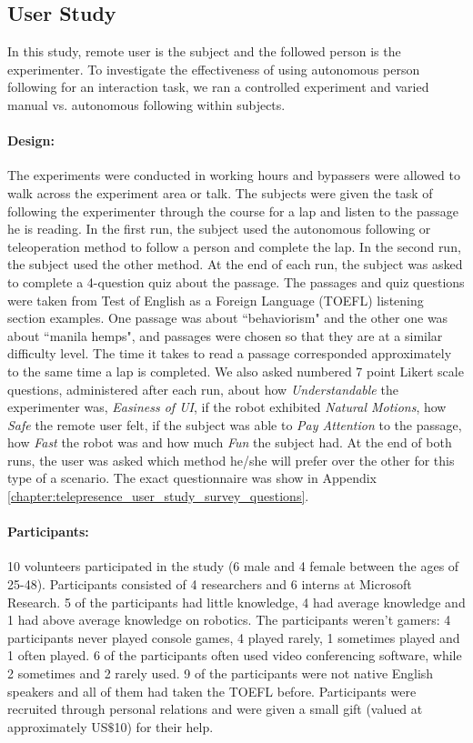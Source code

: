 \subsection{User Study}

In this study, remote user is the subject and the followed person is the experimenter. To investigate the effectiveness of using autonomous person following for an interaction task, we ran a controlled experiment and varied manual vs. autonomous following within subjects.

\paragraph{Design:}
The experiments were conducted in working hours and bypassers were allowed to walk across the experiment area or talk. The subjects were given the task of following the experimenter through the course for a lap and listen to the passage he is reading. In the first run, the subject used the autonomous following or teleoperation method to follow a person and complete the lap. In the second run, the subject used the other method. At the end of each run, the subject was asked to complete a 4-question quiz about the passage. The passages and quiz questions were taken from Test of English as a Foreign Language (TOEFL) listening section examples. One passage was about ``behaviorism" and the other one was about ``manila hemps", and passages were chosen so that they are at a similar difficulty level. The time it takes to read a passage corresponded approximately to the same time a lap is completed. We also asked numbered 7 point Likert scale questions, administered after each run, about how \emph{Understandable} the experimenter was, \emph{Easiness of UI}, if the robot exhibited \emph {Natural Motions}, how \emph{Safe} the remote user felt, if the subject was able to \emph{Pay Attention} to the passage, how \emph{Fast} the robot was and how much \emph{Fun} the subject had. At the end of both runs, the user was asked which method he/she will prefer over the other for this type of a scenario. The exact questionnaire was show in Appendix \ref{chapter:telepresence_user_study_survey_questions}.

\paragraph{Participants:}

10 volunteers participated in the study (6 male and 4 female between the ages of 25-48). Participants consisted of 4 researchers and 6 interns at Microsoft Research. 5 of the participants had little knowledge, 4 had average knowledge and 1 had above average knowledge on robotics. The participants weren't gamers: 4 participants never played console games, 4 played rarely, 1 sometimes played and 1 often played. 6 of the participants often used video conferencing software, while 2 sometimes and 2 rarely used. 9 of the participants were not native English speakers and all of them had taken the TOEFL before. Participants were recruited through personal relations and were given a small gift (valued at approximately US$ \$ $10) for their help.


